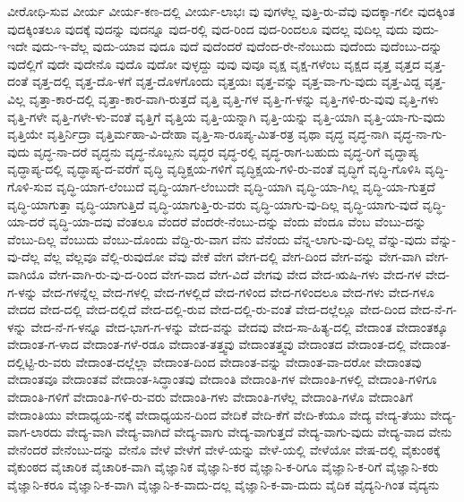 {ವೀರೋಧಿ-ಸುವ
ವೀರ್ಯ
ವೀರ್ಯ-ಕಣ-ದಲ್ಲಿ
ವೀರ್ಯ-ಲಾಭಃ
ವು
ವುಗಳೆಲ್ಲ
ವುತ್ತಿ-ರು-ವೆವು
ವುದಕ್ಕಾ-ಗಲೀ
ವುದಕ್ಕಿಂತ
ವುದಕ್ಕಿಂತಲೂ
ವುದಕ್ಕೆ
ವುದನ್ನು
ವುದನ್ನೂ
ವುದ-ರಲ್ಲಿ
ವುದ-ರಿಂದ
ವುದ-ರಿಂದಲೂ
ವುದಲ್ಲ
ವುದಿಲ್ಲ
ವುದು
ವುದು-ಇದೇ
ವುದು-ಇ-ವೆಲ್ಲ
ವುದು-ಯಾವ
ವುದೂ
ವುದೆ
ವುದೆಂದರೆ
ವುದೆಂದ-ರೇ-ನೆಂಬುದು
ವುದೆಂದು
ವುದೆಂಬು-ದನ್ನು
ವುದೆಲ್ಲಿಗೆ
ವುದೇ
ವುದೇನೊ
ವುದೊ
ವುದೋ
ವುಳ್ಳದ್ದು
ವುವು
ವುವೂ
ವೃಕ್ಷ
ವೃಕ್ಷ-ಗಳೆಂಬ
ವೃಕ್ಷದ
ವೃತ್ತ
ವೃತ್ತದ
ವೃತ್ತ-ದಂತೆ
ವೃತ್ತ-ದಲ್ಲಿ
ವೃತ್ತ-ದೊ-ಳಗೆ
ವೃತ್ತ-ದೊಳಗೊಂದು
ವೃತ್ತಯಃ
ವೃತ್ತ-ವನ್ನು
ವೃತ್ತ-ವಾ-ಗು-ವುದು
ವೃತ್ತ-ವಿದ್ದ
ವೃತ್ತ-ವಿಲ್ಲ
ವೃತ್ತಾ-ಕಾರ-ದಲ್ಲಿ
ವೃತ್ತಾ-ಕಾರ-ವಾಗಿ-ರುತ್ತದೆ
ವೃತ್ತಿ
ವೃತ್ತಿ-ಗಳ
ವೃತ್ತಿ-ಗ-ಳನ್ನು
ವೃತ್ತಿ-ಗಳಿ-ರು-ವುವು
ವೃತ್ತಿ-ಗಳು
ವೃತ್ತಿ-ಗಳೇ
ವೃತ್ತಿ-ಗಳೇ-ಳು-ವಂತೆ
ವೃತ್ತಿಗೆ
ವೃತ್ತಿಯ
ವೃತ್ತಿ-ಯನ್ನಾಗಿ
ವೃತ್ತಿ-ಯನ್ನು
ವೃತ್ತಿ-ಯಾಗಿ
ವೃತ್ತಿ-ಯಾ-ಗು-ವುದು
ವೃತ್ತಿಯೇ
ವೃತ್ತಿರ್ನಿದ್ರಾ
ವೃತ್ತಿರ್ಮಹಾ-ವಿ-ದೇಹಾ
ವೃತ್ತಿ-ಸಾ-ರೂಪ್ಯ-ಮಿತ-ರತ್ರ
ವೃಥಾ
ವೃದ್ಧ
ವೃದ್ಧ-ನಾಗಿ
ವೃದ್ಧ-ನಾ-ಗು-ವುದು
ವೃದ್ಧ-ನಾ-ದರೆ
ವೃದ್ಧನು
ವೃದ್ಧ-ನೊಬ್ಬನು
ವೃದ್ಧರ
ವೃದ್ಧ-ರಲ್ಲಿ
ವೃದ್ಧ-ರಾಗ-ಬಹುದು
ವೃದ್ಧ-ರಿಗೆ
ವೃದ್ಧಾಪ್ಯ
ವೃದ್ಧಾಪ್ಯ-ದಲ್ಲಿ
ವೃದ್ಧಾಪ್ಯ-ದ-ವರೆಗೆ
ವೃದ್ಧಿ
ವೃದ್ಧಿಕ್ಷಯ-ಗಳಿಗೆ
ವೃದ್ಧಿಕ್ಷಯ-ಗಳಿ-ರು-ವಂತೆ
ವೃದ್ಧಿಗೆ
ವೃದ್ಧಿ-ಗೊಳಿಸಿ
ವೃದ್ಧಿ-ಗೊಳಿ-ಸುವ
ವೃದ್ಧಿ-ಯಾಗ-ಲೆಂಬುದೆ
ವೃದ್ಧಿ-ಯಾಗ-ಲೆಂಬುದೇ
ವೃದ್ಧಿ-ಯಾಗಿ
ವೃದ್ಧಿ-ಯಾ-ಗಿಲ್ಲ
ವೃದ್ಧಿ-ಯಾ-ಗುತ್ತದೆ
ವೃದ್ಧಿ-ಯಾಗುತ್ತಾ
ವೃದ್ಧಿ-ಯಾಗುತ್ತಿದೆ
ವೃದ್ಧಿ-ಯಾಗುತ್ತಿ-ರು-ವರು
ವೃದ್ಧಿ-ಯಾಗು-ವು-ದಿಲ್ಲ
ವೃದ್ಧಿ-ಯಾಗು-ವುದೆ
ವೃದ್ಧಿ-ಯಾ-ದರೆ
ವೃದ್ಧಿ-ಯಾ-ದವು
ವೆಂತಲೂ
ವೆಂದರೆ
ವೆಂದರೇ-ನೆಂಬು-ದನ್ನು
ವೆಂದು
ವೆಂದೂ
ವೆಂಬ
ವೆಂಬು-ದನ್ನು
ವೆಂಬು-ದಿಲ್ಲ
ವೆಂಬುದು
ವೆಂಬು-ದೊಂದು
ವೆದ್ದಿ-ರು-ವಾಗ
ವೆನು
ವೆನೆಂದು
ವೆನ್ನ-ಲಾಗು-ವು-ದಿಲ್ಲ
ವೆನ್ನು-ವುದು
ವೆನ್ನು-ವು-ದೆಲ್ಲ
ವೆಲ್ಲ
ವೆಲ್ಲವೂ
ವೆಲ್ಲಿ-ರುವುದೋ
ವೆವು
ವೇಕೆ
ವೇಗ
ವೇಗ-ದಲ್ಲಿ
ವೇಗ-ದಿಂದ
ವೇಗ-ವನ್ನು
ವೇಗ-ವಾಗಿ
ವೇಗ-ವಾಗಿಯೊ
ವೇಗ-ವಾಗಿ-ರು-ವು-ದ-ರಿಂದ
ವೇಗ-ವಾದ
ವೇಗ-ವಿದೆ
ವೇಗವು
ವೇದ
ವೇದ-ಋಷಿ-ಗಳು
ವೇದ-ಗಳ
ವೇದ-ಗ-ಳನ್ನು
ವೇದ-ಗಳನ್ನೆಲ್ಲ
ವೇದ-ಗಳಲ್ಲಿ
ವೇದ-ಗಳಲ್ಲಿದೆ
ವೇದ-ಗಳಿಂದ
ವೇದ-ಗಳಿಂದಲೂ
ವೇದ-ಗಳು
ವೇದ-ಗಳೂ
ವೇದದ
ವೇದ-ದಲ್ಲಿ
ವೇದ-ದಲ್ಲಿದೆ
ವೇದ-ದಲ್ಲಿ-ರುವ
ವೇದ-ದಲ್ಲಿ-ರು-ವಂತೆ
ವೇದ-ದಲ್ಲೆಲ್ಲೂ
ವೇದ-ದಿಂದ
ವೇದ-ನೆ-ಗ-ಳನ್ನು
ವೇದ-ನೆ-ಗ-ಳನ್ನೂ
ವೇದ-ಭಾಗ-ಗ-ಳನ್ನು
ವೇದ-ವನ್ನು
ವೇದವು
ವೇದ-ಸಾ-ಹಿತ್ಯ-ದಲ್ಲಿ
ವೇದಾಂತ
ವೇದಾಂತಕ್ಕೂ
ವೇದಾಂತ-ಗ-ಳಾದ
ವೇದಾಂತ-ಗಳೆ-ರಡೂ
ವೇದಾಂತ-ತತ್ತ್ವವು
ವೇದಾಂತತ್ತ್ವವು
ವೇದಾಂತದ
ವೇದಾಂತ-ದಲ್ಲಿ
ವೇದಾಂತ-ದಲ್ಲಿಟ್ಟಿ-ರು-ವರು
ವೇದಾಂತ-ದಲ್ಲೆಲ್ಲಾ
ವೇದಾಂತ-ದಿಂದ
ವೇದಾಂತ-ವನ್ನು
ವೇದಾಂತ-ವಾ-ದರೋ
ವೇದಾಂತವು
ವೇದಾಂತವೂ
ವೇದಾಂತವೆ
ವೇದಾಂತ-ಸಿದ್ಧಾಂತವು
ವೇದಾಂತಿ
ವೇದಾಂತಿ-ಗಳ
ವೇದಾಂತಿ-ಗಳಲ್ಲಿ
ವೇದಾಂತಿ-ಗಳಿಗೂ
ವೇದಾಂತಿ-ಗಳಿಗೆ
ವೇದಾಂತಿ-ಗಳಿ-ರು-ವರು
ವೇದಾಂತಿ-ಗಳು
ವೇದಾಂತಿ-ಗಳೆಲ್ಲ
ವೇದಾಂತಿ-ಗಳೊ
ವೇದಾಂತಿಗೆ
ವೇದಾಂತಿಯು
ವೇದಾಧ್ಯಯ-ನಕ್ಕೆ
ವೇದಾಧ್ಯಯನ-ದಿಂದ
ವೇದಿಕೆ
ವೇದಿ-ಕೆಗೆ
ವೇದಿ-ಕೆಯೂ
ವೇದ್ಯ
ವೇದ್ಯ-ತೆಯು
ವೇದ್ಯ-ವಾಗ-ಲಾರದು
ವೇದ್ಯ-ವಾಗಿ
ವೇದ್ಯ-ವಾಗಿದೆ
ವೇದ್ಯ-ವಾಗು
ವೇದ್ಯ-ವಾಗುತ್ತದೆ
ವೇದ್ಯ-ವಾಗು-ವುದು
ವೇದ್ಯ-ವಾದ
ವೇನು
ವೇನೆಂದರೆ
ವೇನೆಂಬು-ದನ್ನು
ವೇನೊ
ವೇಳೆ
ವೇಳೆಗೆ
ವೇಳೆ-ಯನ್ನು
ವೇಳೆ-ಯಲ್ಲಿ
ವೇಳೆಯೋ
ವೇಷ-ದಲ್ಲಿ
ವೈಕುಂಠಕ್ಕೆ
ವೈಕುಂಠದ
ವೈಚಾರಿಕ
ವೈಚಾರಿಕ-ವಾಗಿ
ವೈಜ್ಞಾನಿಕ
ವೈಜ್ಞಾನಿ-ಕರ
ವೈಜ್ಞಾನಿ-ಕ-ರಿಗೂ
ವೈಜ್ಞಾನಿ-ಕ-ರಿಗೆ
ವೈಜ್ಞಾನಿ-ಕರು
ವೈಜ್ಞಾನಿ-ಕರೂ
ವೈಜ್ಞಾನಿ-ಕ-ವಾಗಿ
ವೈಜ್ಞಾನಿ-ಕ-ವಾದು-ದಲ್ಲ
ವೈಜ್ಞಾನಿ-ಕ-ವಾ-ದುದು
ವೈದಿಕ
ವೈದ್ಯನಿ-ಗಿಂತ
ವೈದ್ಯನು
}
